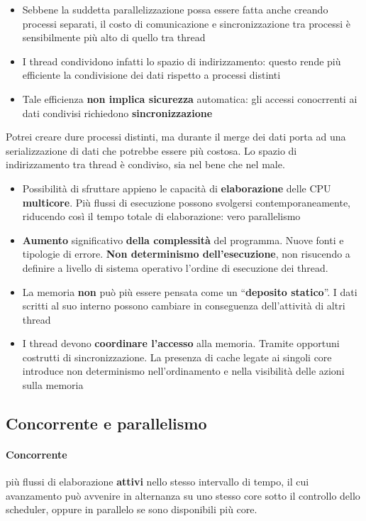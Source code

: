 \begin{itemize}
  \item  Sebbene la suddetta parallelizzazione possa essere fatta anche creando processi separati, il costo di
        comunicazione e sincronizzazione tra processi è sensibilmente più alto di quello tra thread
  \item I thread condividono infatti lo spazio di indirizzamento: questo rende più efficiente la condivisione dei
        dati rispetto a processi distinti
  \item Tale efficienza \textbf{non implica sicurezza} automatica: gli accessi conocrrenti ai
        dati condivisi richiedono \textbf{sincronizzazione}
\end{itemize}

Potrei creare dure processi distinti, ma durante il merge dei dati porta ad una serializzazione
di dati che potrebbe essere più costosa.
Lo spazio di indirizzamento tra thread è condiviso, sia nel bene che nel male.

\begin{itemize}
  \item Possibilità di sfruttare appieno le capacità di \textbf{elaborazione} delle CPU
        \textbf{multicore}. Più flussi di esecuzione possono svolgersi contemporaneamente,
        riducendo così il tempo totale di elaborazione: vero parallelismo
  \item \textbf{Aumento} significativo \textbf{della complessità} del programma. Nuove fonti e
        tipologie di errore. \textbf{Non determinismo dell'esecuzione}, non risucendo a definire
        a livello di sistema operativo l'ordine di esecuzione dei thread.
  \item La memoria \textbf{non} può più essere pensata come un ``\textbf{deposito statico}''. I
        dati scritti al suo interno possono cambiare in conseguenza dell'attività di
        altri thread
  \item I thread devono \textbf{coordinare l'accesso} alla memoria. Tramite opportuni
        costrutti di sincronizzazione. La presenza di cache legate ai singoli core
        introduce non determinismo nell'ordinamento e nella visibilità delle azioni
        sulla memoria
\end{itemize}

\subsection{Concorrente e parallelismo}

\paragraph{Concorrente} più flussi di elaborazione \textbf{attivi} nello stesso
intervallo di tempo, il cui avanzamento può avvenire in alternanza su uno
stesso core sotto il controllo dello scheduler, oppure in parallelo se sono
disponibili più core.

